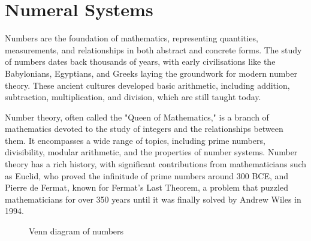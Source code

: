 \chapter{Numeral Systems}
\label{chap:ch2}
Numbers are the foundation of mathematics, representing quantities, measurements, and relationships in both abstract and concrete forms. The study of numbers dates back thousands of years, with early civilisations like the Babylonians, Egyptians, and Greeks laying the groundwork for modern number theory. These ancient cultures developed basic arithmetic, including addition, subtraction, multiplication, and division, which are still taught today.

Number theory, often called the "Queen of Mathematics," is a branch of mathematics devoted to the study of integers and the relationships between them. It encompasses a wide range of topics, including prime numbers, divisibility, modular arithmetic, and the properties of number systems. Number theory has a rich history, with significant contributions from mathematicians such as Euclid, who proved the infinitude of prime numbers around 300 BCE, and Pierre de Fermat, known for Fermat's Last Theorem, a problem that puzzled mathematicians for over 350 years until it was finally solved by Andrew Wiles in 1994.

\begin{figure}[htbp]
    \centering
{}
    \caption{Venn diagram of numbers}
    \label{fig:venn_num}
\end{figure}

